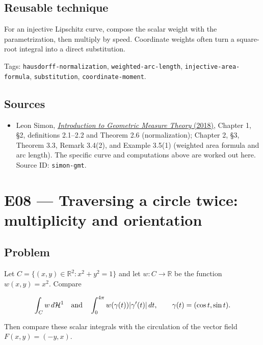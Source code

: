 \documentclass[
  11pt,
]{article}
\providecommand{\tightlist}{%
  \setlength{\itemsep}{0pt}\setlength{\parskip}{0pt}}
\begin{document}
\subsection{Reusable technique}\label{reusable-technique-6}

For an injective Lipschitz curve, compose the scalar weight with the
parametrization, then multiply by speed. Coordinate weights often turn a
square-root integral into a direct substitution.

\begingroup\small\raggedright Tags: \texttt{hausdorff-\allowbreak{}normalization}, \texttt{weighted-\allowbreak{}arc-\allowbreak{}length},
\texttt{injective-\allowbreak{}area-\allowbreak{}formula}, \texttt{substitution},
\texttt{coordinate-\allowbreak{}moment}.\par\endgroup

\subsection{Sources}\label{sources-6}

\begin{itemize}
\tightlist
\item
  Leon Simon,
  \href{https://math.stanford.edu/~lms/ntu-gmt-text.pdf}{\emph{Introduction
  to Geometric Measure Theory} (2018)}, Chapter 1, §2, definitions
  2.1--2.2 and Theorem 2.6 (normalization); Chapter 2, §3, Theorem 3.3,
  Remark 3.4(2), and Example 3.5(1) (weighted area formula and arc
  length). The specific curve and computations above are worked out
  here. Source ID: \texttt{simon-\allowbreak{}gmt}.
\end{itemize}

\section{E08 --- Traversing a circle twice: multiplicity and
orientation}\label{E08}

\subsection{Problem}\label{problem-7}

Let \(C=\{(x,y)\in\mathbb R^2:x^2+y^2=1\}\) and let \(w:C\to\mathbb R\)
be the function \(w(x,y)=x^2\). Compare

\[
\int_C w\,d\mathcal H^1
\quad\hbox{and}\quad
\int_0^{4\pi}w(\gamma(t))|\gamma'(t)|\,dt,
\qquad \gamma(t)=(\cos t,\sin t).
\]

Then compare these scalar integrals with the circulation of the vector
field \(F(x,y)=(-y,x)\).
\end{document}
